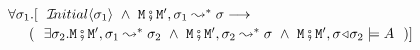 \begin{definition}
\begin{itemize}
%
$\forall \sigma_1. [\ \ \Initial{\sigma_1}\ \wedge \  \M\mkpair \M',\sigma_1 \leadsto^* \sigma \longrightarrow $\\
 $\strut ~ \hspace{0.1in} $   \hfill   $(\ \  \exists \sigma_2.
 \M\mkpair \M',\sigma_1 \leadsto^* \sigma_2 \ \wedge\  \M\mkpair \M',\sigma_2 \leadsto^* \sigma \ \wedge \ 
 \M\mkpair \M', \sigma\adapt\sigma_2  \models \A\ \ 
 )]$ 
\end{itemize}
\end{definition}

%
 
